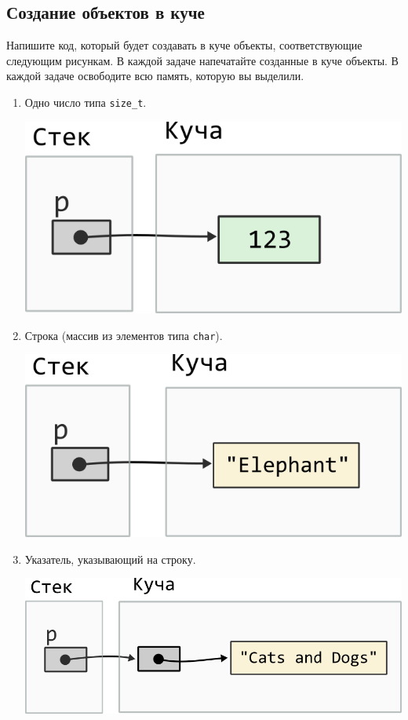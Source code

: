 \documentclass{article}
\begin{document}
\subsection{Создание объектов в куче}

Напишите код, который будет создавать в куче объекты, соответствующие следующим рисункам. В каждой задаче напечатайте созданные в куче объекты. В каждой задаче освободите всю память, которую вы выделили.
\begin{enumerate}
\item Одно число типа \texttt{size\_t}.
\begin{center}
\includegraphics[scale=\mallocImagesScale]{../images/malloc_homework/00heap_size_t.png}
\end{center}


\item Строка (массив из элементов типа \texttt{char}).
\begin{center}
\includegraphics[scale=\mallocImagesScale]{../images/malloc_homework/01heap_char_array.png}
\end{center}

\item Указатель, указывающий на строку.
\begin{center}
\includegraphics[scale=\mallocImagesScale]{../images/malloc_homework/02heap_pointer_char_array.png}
\end{center}



\end{enumerate}
\end{document}
